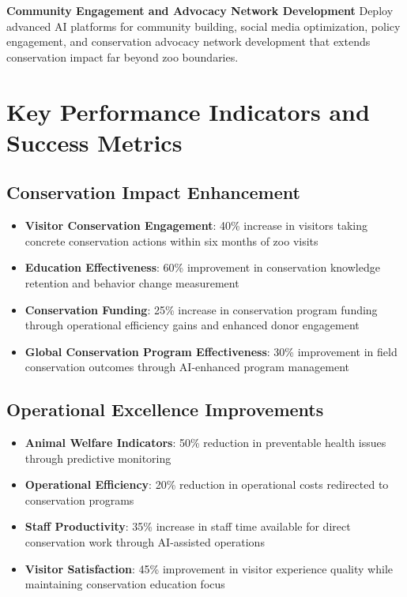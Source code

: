 \documentclass[
  Letterpaper,
]{scrbook}
\providecommand{\tightlist}{%
  \setlength{\itemsep}{0pt}\setlength{\parskip}{0pt}}
\begin{document}
\textbf{Community Engagement and Advocacy Network Development} Deploy
advanced AI platforms for community building, social media optimization,
policy engagement, and conservation advocacy network development that
extends conservation impact far beyond zoo boundaries.

\section*{Key Performance Indicators and Success
Metrics}\label{key-performance-indicators-and-success-metrics}


\subsection*{Conservation Impact
Enhancement}\label{conservation-impact-enhancement}

\begin{itemize}
\tightlist
\item
  \textbf{Visitor Conservation Engagement}: 40\% increase in visitors
  taking concrete conservation actions within six months of zoo visits
\item
  \textbf{Education Effectiveness}: 60\% improvement in conservation
  knowledge retention and behavior change measurement
\item
  \textbf{Conservation Funding}: 25\% increase in conservation program
  funding through operational efficiency gains and enhanced donor
  engagement
\item
  \textbf{Global Conservation Program Effectiveness}: 30\% improvement
  in field conservation outcomes through AI-enhanced program management
\end{itemize}

\subsection*{Operational Excellence
Improvements}\label{operational-excellence-improvements}

\begin{itemize}
\tightlist
\item
  \textbf{Animal Welfare Indicators}: 50\% reduction in preventable
  health issues through predictive monitoring
\item
  \textbf{Operational Efficiency}: 20\% reduction in operational costs
  redirected to conservation programs
\item
  \textbf{Staff Productivity}: 35\% increase in staff time available for
  direct conservation work through AI-assisted operations
\item
  \textbf{Visitor Satisfaction}: 45\% improvement in visitor experience
  quality while maintaining conservation education focus
\end{itemize}
\end{document}
